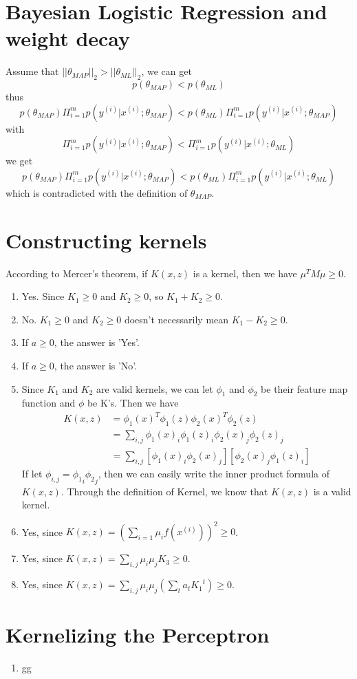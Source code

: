\documentclass[12pt]{article}
\begin{document}
    \newpage
    \section*{Bayesian Logistic Regression and weight decay }
    Assume that $||\theta_{MAP}||_2 > ||\theta_{ML}||_2$,
    we can get $$p(\theta_{MAP}) < p(\theta_{ML})$$
    thus $$p(\theta_{MAP})\Pi_{i=1}^{m}p(y^{(i)}|x^{(i)};\theta_{MAP}) < p(\theta_{ML})\Pi_{i=1}^{m}p(y^{(i)}|x^{(i)};\theta_{MAP})$$
    with $$\Pi_{i=1}^{m}p(y^{(i)}|x^{(i)};\theta_{MAP}) < \Pi_{i=1}^{m}p(y^{(i)}|x^{(i)};\theta_{ML})$$
    we get $$p(\theta_{MAP})\Pi_{i=1}^{m}p(y^{(i)}|x^{(i)};\theta_{MAP}) < p(\theta_{ML})\Pi_{i=1}^{m}p(y^{(i)}|x^{(i)};\theta_{ML})$$
    which is contradicted with the definition of $\theta_{MAP}$.

    \section*{Constructing kernels}
    According to Mercer's theorem, if $K(x,z)$ is a kernel, then we have $\mu^T M \mu \geq 0$.
    \begin{enumerate}[label=(\alph*)]
        \item Yes. Since $K_1 \geq 0$ and $K_2 \geq 0$, so $K_1 + K_2 \geq 0$.
        \item No. $K_1 \geq 0$ and $K_2 \geq 0$ doesn't necessarily mean $K_1 - K_2 \geq 0$.
        \item If $a \geq 0$, the answer is 'Yes'. 
        \item If $a \geq 0$, the answer is 'No'.
        \item 
        Since $K_1$ and $K_2$ are valid kernels, we can let $\phi_1$ and $\phi_2$ be their feature map function and $\phi$ be K's.
        Then we have
        \begin{equation*}
            \begin{split}
                K(x,z) &= \phi_1(x)^T\phi_1(z)\phi_2(x)^T\phi_2(z) \\
                &= \sum_{i,j} \phi_1(x)_i\phi_1(z)_i\phi_2(x)_j\phi_2(z)_j \\
                &= \sum_{i,j} [\phi_1(x)_i\phi_2(x)_j][\phi_2(x)_j\phi_1(z)_i]
            \end{split}
        \end{equation*}
        If let $\phi_{i,j} =  {\phi_1}_i{\phi_2}_j $, then we can easily write the inner product formula of $K(x,z)$.
        Through the definition of Kernel, we know that $K(x,z)$ is a valid kernel.
        \item Yes, since $K(x,z) = (\sum_{i=1} \mu_i f(x^{(i)}))^2 \geq 0$.
        \item Yes, since $K(x,z) = \sum_{i,j} \mu_i \mu_j K_3 \geq 0$.
        \item Yes, since $K(x,z) = \sum_{i,j} \mu_i \mu_j (\sum_t a_t {K_1}^t) \geq 0$.
    \end{enumerate}

    \section*{Kernelizing the Perceptron}
    \begin{enumerate}[label=(\alph*)]
        \item gg
    \end{enumerate}
\end{document}
